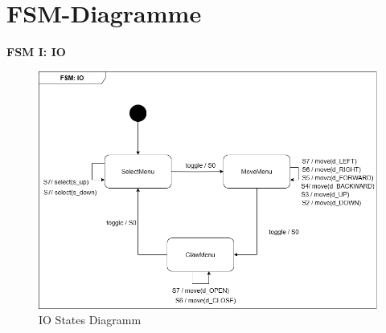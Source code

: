 










\clearpage
\section{FSM-Diagramme}

\textbf{FSM I: IO}\\
\begin{figure}[h]  
    \centering
    \includegraphics[width=0.8\linewidth]{diagrams/FSM_IO.drawio.png}
    \caption{IO States Diagramm}
    \label{fig:IO_States_Diagramm}
\end{figure}

\clearpage 









